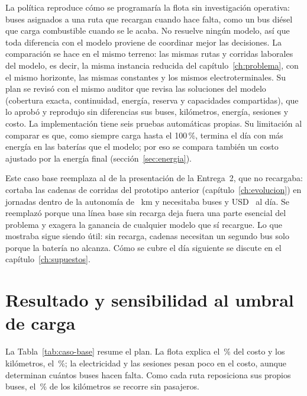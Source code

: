 La política reproduce cómo se programaría la flota sin investigación operativa: buses asignados a una ruta que recargan cuando hace falta, como un bus diésel que carga combustible cuando se le acaba. No resuelve ningún modelo, así que toda diferencia con el modelo proviene de coordinar mejor las decisiones. La comparación se hace en el mismo terreno: las mismas \RutasMuestra{} rutas y \CorridasMuestra{} corridas laborales del modelo, es decir, la misma instancia reducida del capítulo~\ref{ch:problema}, con el mismo horizonte, las mismas constantes y los mismos electroterminales. Su plan se revisó con el mismo auditor que revisa las soluciones del modelo (cobertura exacta, continuidad, energía, reserva y capacidades compartidas), que lo aprobó y reprodujo sin diferencias sus buses, kilómetros, energía, sesiones y costo. La implementación tiene seis pruebas automáticas propias. Su limitación al comparar es que, como siempre carga hasta el 100\,\%, termina el día con más energía en las baterías que el modelo; por eso se compara también un costo ajustado por la energía final (sección~\ref{sec:energia}).

Este caso base reemplaza al de la presentación de la Entrega~2, que no recargaba: cortaba las cadenas de corridas del prototipo anterior (capítulo~\ref{ch:evolucion}) en jornadas dentro de la autonomía de \Autonomia~km y necesitaba \BusesSinRecargas{} buses y USD~\CostoSinRecargas{} al día. Se reemplazó porque una línea base sin recarga deja fuera una parte esencial del problema y exagera la ganancia de cualquier modelo que sí recargue. Lo que mostraba sigue siendo útil: sin recarga, \BusesExtraSinRecargas{} cadenas necesitan un segundo bus solo porque la batería no alcanza. Cómo se cubre el día siguiente se discute en el capítulo~\ref{ch:supuestos}.

\section{Resultado y sensibilidad al umbral de carga}
\label{sec:resultado-caso-base}

La Tabla~\ref{tab:caso-base} resume el plan. La flota explica el \PctFlotaBase\,\% del costo y los kilómetros, el \PctKmBase\,\%; la electricidad y las sesiones pesan poco en el costo, aunque determinan cuántos buses hacen falta. Como cada ruta reposiciona sus propios buses, el \PctVacioBase\,\% de los kilómetros se recorre sin pasajeros.

